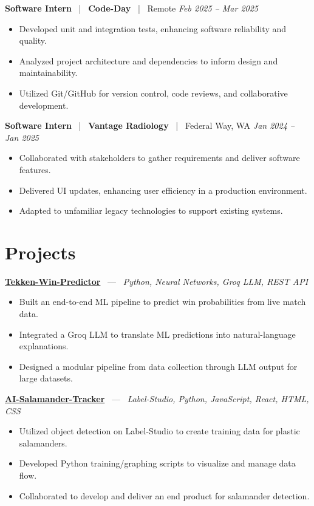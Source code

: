 \documentclass[10pt, letterpaper]{article}
\newcommand{\jobhead}[4]{%
  \vspace{5pt}%
  {\bfseries\color{dark}#1}%
  ~{\color{light}|}~%
  {\bfseries\color{navy}#2}%
  ~{\color{light}|}~%
  {\color{light}#3}%
  \hfill{\color{light}\small\textit{#4}}\\[-2pt]%
}
\newcommand{\projhead}[3]{%
  \vspace{5pt}%
  {\bfseries\color{dark}\href{#2}{#1}}%
  ~{\color{light}---}~%
  {\color{light}\small\textit{#3}}\\[-2pt]%
}
\begin{document}
\jobhead{Software Intern}{Code-Day}{Remote}{Feb 2025 – Mar 2025}
\begin{itemize}
  \item Developed unit and integration tests, enhancing software reliability and quality.
  \item Analyzed project architecture and dependencies to inform design and maintainability.
  \item Utilized Git/GitHub for version control, code reviews, and collaborative development.
\end{itemize}

\jobhead{Software Intern}{Vantage Radiology}{Federal Way, WA}{Jan 2024 – Jan 2025}
\begin{itemize}
  \item Collaborated with stakeholders to gather requirements and deliver software features.
  \item Delivered UI updates, enhancing user efficiency in a production environment.
  \item Adapted to unfamiliar legacy technologies to support existing systems.
\end{itemize}

\section{Projects}

\projhead{Tekken-Win-Predictor}{}{Python, Neural Networks, Groq LLM, REST API}
\begin{itemize}
  \item Built an end-to-end ML pipeline to predict win probabilities from live match data.
  \item Integrated a Groq LLM to translate ML predictions into natural-language explanations.
  \item Designed a modular pipeline from data collection through LLM output for large datasets.
\end{itemize}

\projhead{AI-Salamander-Tracker}{https://github.com/xavierb117/Salamander-Tracker-YOLO}{Label-Studio, Python, JavaScript, React, HTML, CSS}
\begin{itemize}
  \item Utilized object detection on Label-Studio to create training data for plastic salamanders.
  \item Developed Python training/graphing scripts to visualize and manage data flow.
  \item Collaborated to develop and deliver an end product for salamander detection.
\end{itemize}
\end{document}
